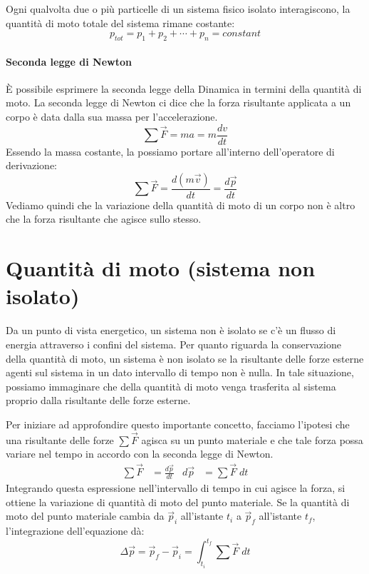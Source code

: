 \documentclass[a4paper,11pt,oneside]{book}
\begin{document}
Ogni qualvolta due o più particelle di un sistema fisico isolato interagiscono, la quantità di moto totale del sistema rimane costante:
\begin{equation*}
    p_{tot} = p_1 + p_2 + \dotsb + p_{n} = constant
\end{equation*}

\paragraph{Seconda legge di Newton} È possibile esprimere la seconda legge della Dinamica in termini della quantità di moto. 
La seconda legge di Newton ci dice che la forza risultante applicata a un corpo è data dalla sua massa per l'accelerazione.
\begin{equation*}
    \sum \vec{F} = ma = m \frac{dv}{dt}
\end{equation*}
Essendo la massa costante, la possiamo portare all'interno dell'operatore di derivazione:
\begin{equation*}
    \sum \vec{F} = \frac{d(m\vec{v})}{dt} = \frac{d\vec{p}}{dt}
\end{equation*}
Vediamo quindi che la variazione della quantità di moto di un corpo non è altro che la forza risultante che agisce sullo stesso.

\section{Quantità di moto (sistema non isolato)}
Da un punto di vista energetico, un sistema non è isolato se c’è un flusso di energia attraverso i confini del sistema. Per quanto riguarda la conservazione della quantità di moto, un sistema è non isolato se la risultante delle forze esterne agenti sul sistema in un dato intervallo di tempo non è nulla. 
In tale situazione, possiamo immaginare che della quantità di moto venga trasferita al sistema proprio dalla risultante delle forze esterne.

Per iniziare ad approfondire questo importante concetto, facciamo l’ipotesi che una risultante delle forze $\sum \vec{F}$ agisca su un punto materiale e che tale forza possa variare nel tempo in accordo con la seconda legge di Newton.
\begin{align*}
    \sum \vec{F} &= \tfrac{d\vec{p}}{dt} & d\vec{p} &= \sum\vec{F} \; dt
\end{align*}
Integrando questa espressione nell’intervallo di tempo in cui agisce la forza, si ottiene la variazione di quantità di moto del punto materiale.
Se la quantità di moto del punto materiale cambia da $\vec{p}_i$ all’istante $t_i$ a $\vec{p}_f$ all’istante $t_f$, l'integrazione dell'equazione dà:
\begin{equation*}
    \Delta \vec{p} = \vec{p}_f - \vec{p}_i = \int_{t_i}^{t_f} \sum \vec{F} \; dt
\end{equation*}
\end{document}

